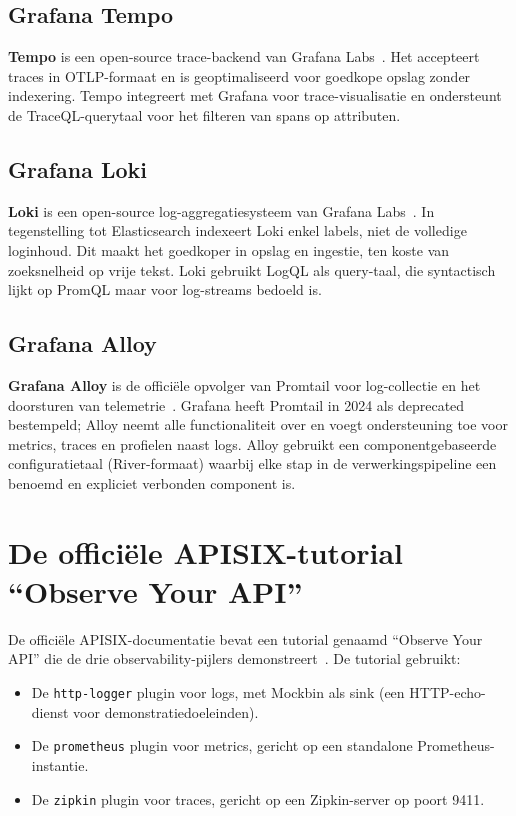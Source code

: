 \subsection{Grafana Tempo}

\textbf{Tempo} is een open-source trace-backend van Grafana Labs~\autocite{Tempo2024}. Het accepteert traces in OTLP-formaat en is geoptimaliseerd voor goedkope opslag zonder indexering. Tempo integreert met Grafana voor trace-visualisatie en ondersteunt de TraceQL-querytaal voor het filteren van spans op attributen.

\subsection{Grafana Loki}

\textbf{Loki} is een open-source log-aggregatiesysteem van Grafana Labs~\autocite{Loki2024}. In tegenstelling tot Elasticsearch indexeert Loki enkel labels, niet de volledige loginhoud. Dit maakt het goedkoper in opslag en ingestie, ten koste van zoeksnelheid op vrije tekst. Loki gebruikt LogQL als query-taal, die syntactisch lijkt op PromQL maar voor log-streams bedoeld is.

\subsection{Grafana Alloy}

\textbf{Grafana Alloy} is de officiële opvolger van Promtail voor log-collectie en het doorsturen van telemetrie~\autocite{Alloy2024}. Grafana heeft Promtail in 2024 als deprecated bestempeld; Alloy neemt alle functionaliteit over en voegt ondersteuning toe voor metrics, traces en profielen naast logs. Alloy gebruikt een componentgebaseerde configuratietaal (River-formaat) waarbij elke stap in de verwerkingspipeline een benoemd en expliciet verbonden component is.

\section{De officiële APISIX-tutorial ``Observe Your API''}%
\label{sec:apisix-tutorial}

De officiële APISIX-documentatie bevat een tutorial genaamd ``Observe Your API'' die de drie observability-pijlers demonstreert~\autocite{APISIXObserveTutorial2024}. De tutorial gebruikt:

\begin{itemize}
  \item De \texttt{http-logger} plugin voor logs, met Mockbin als sink (een HTTP-echo-dienst voor demonstratiedoeleinden).
  \item De \texttt{prometheus} plugin voor metrics, gericht op een standalone Prometheus-instantie.
  \item De \texttt{zipkin} plugin voor traces, gericht op een Zipkin-server op poort 9411.
\end{itemize}

